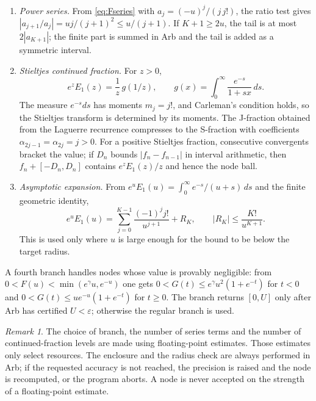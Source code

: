 \documentclass[11pt,a4paper]{article}
\theoremstyle{remark}
\newtheorem*{remark}{Remark}
\newcommand{\Eone}{E_1}
\begin{document}
\begin{enumerate}[leftmargin=1.6em]
\item \emph{Power series.} From \eqref{eq:Fseries} with
  $a_j=(-u)^j/(j\,j!)$, the ratio test gives
  $|a_{j+1}/a_j|=uj/(j+1)^2\le u/(j+1)$. If $K+1\ge2u$, the tail is at
  most $2|a_{K+1}|$; the finite part is summed in Arb and the tail is
  added as a symmetric interval.
\item \emph{Stieltjes continued fraction.} For $z>0$,
  \begin{equation}
    e^z\Eone(z)=\frac1z\,g(1/z),\qquad
    g(x)=\int_0^\infty\frac{e^{-s}}{1+sx}\,ds .
  \end{equation}
  The measure $e^{-s}ds$ has moments $m_j=j!$, and Carleman's condition
  holds, so the Stieltjes transform is determined by its moments. The
  J-fraction obtained from the Laguerre recurrence compresses to the
  S-fraction with coefficients $\alpha_{2j-1}=\alpha_{2j}=j>0$. For a
  positive Stieltjes fraction, consecutive convergents bracket the
  value; if $D_n$ bounds $|f_n-f_{n-1}|$ in interval arithmetic, then
  $f_n+[-D_n,D_n]$ contains $e^z\Eone(z)/z$ and hence the node ball.
\item \emph{Asymptotic expansion.} From
  $e^u\Eone(u)=\int_0^\infty e^{-s}/(u+s)\,ds$ and the finite geometric
  identity,
  \begin{equation}
    e^u\Eone(u)=\sum_{j=0}^{K-1}\frac{(-1)^j j!}{u^{j+1}}+R_K,
    \qquad |R_K|\le\frac{K!}{u^{K+1}} .
  \end{equation}
  This is used only where $u$ is large enough for the bound to be below
  the target radius.
\end{enumerate}

A fourth branch handles nodes whose value is provably negligible: from
$0<F(u)<\min(e^\gamma u,e^{-u})$ one gets
$0<G(t)\le e^\gamma u^2(1+e^{-t})$ for $t<0$ and
$0<G(t)\le ue^{-u}(1+e^{-t})$ for $t\ge0$. The branch returns $[0,U]$
only after Arb has certified $U<\varepsilon$; otherwise the regular
branch is used.

\begin{remark}
The choice of branch, the number of series terms and the number of
continued-fraction levels are made using floating-point estimates.
Those estimates only select resources. The enclosure and the radius
check are always performed in Arb; if the requested accuracy is not
reached, the precision is raised and the node is recomputed, or the
program aborts. A node is never accepted on the strength of a
floating-point estimate.
\end{remark}
\end{document}
